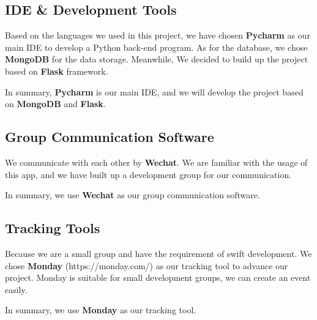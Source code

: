 \documentclass[conference]{IEEEtran}
\begin{document}
\subsection{IDE \& Development Tools}

Based on the languages we used in this project, we have chosen \textbf{Pycharm} as our main IDE to develop a Python back-end program.
 As for the database, we chose \textbf{MongoDB} for the data storage. Meanwhile, We decided to build up the project based on \textbf{Flask} framework.
 
 
 In summary, \textbf{Pycharm} is our main IDE, and we will develop the project based on \textbf{MongoDB} and \textbf{Flask}.
 

\subsection{Group Communication Software}

We communicate with each other by \textbf{Wechat}. We are familiar with the usage of this app, and we have built up a development group for our communication.

In summary, we use \textbf{Wechat} as our group communication software.

\subsection{Tracking Tools}

Because we are a small group and have the requirement of swift development. We chose \textbf{Monday} (https://monday.com/) as our tracking tool to advance our project. Monday is suitable for small development groups, we can create an event easily.

In summary, we use \textbf{Monday} as our tracking tool.
\end{document}
